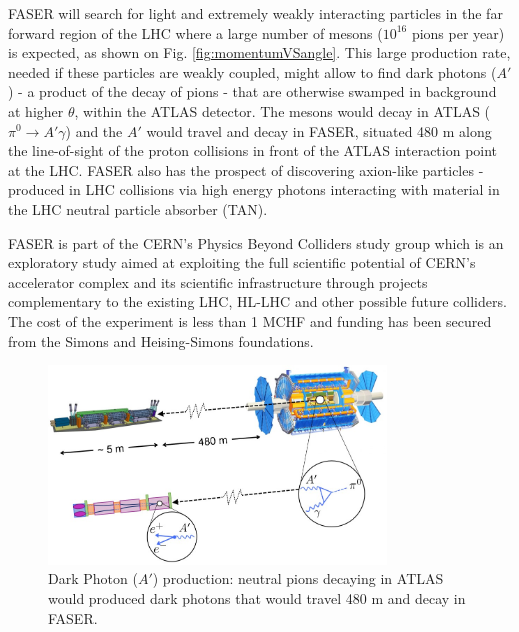 FASER will search for light and extremely weakly interacting particles in the far forward region of the LHC where a large number of mesons ($10^{16}$ pions per year) is expected, as shown on Fig. \ref{fig:momentumVSangle}. This large production rate, needed if these particles are weakly coupled, might allow to find dark photons ($A'$) - a product of the decay of pions - that are otherwise swamped in background at higher $\theta$, within the ATLAS detector. The mesons would decay in ATLAS ($\pi^{0}\rightarrow A'\gamma$) and the $A'$ would travel and decay in FASER, situated 480 m along the line-of-sight of the proton collisions in front of the ATLAS interaction point at the LHC. FASER also has the prospect of discovering axion-like particles - produced in LHC collisions via high energy
photons interacting with material in the LHC neutral particle absorber
(TAN). 

FASER is part of the CERN's Physics Beyond Colliders study group which is an exploratory study aimed at exploiting the full scientific potential of CERN's accelerator complex and its scientific infrastructure through projects complementary to the existing LHC, HL-LHC and other possible future colliders. The cost of the
experiment is less than 1 MCHF and funding has been secured from the Simons and Heising-Simons foundations.

\begin{figure}[htbp!] 
\centering    
\includegraphics[width=0.8\textwidth]{Introduction/Figs/Raster/DarkPhotonProduction.jpg}
\caption[Dark Photon Production]{Dark Photon ($A'$) production: neutral pions decaying in ATLAS would produced dark photons that would travel 480 m and decay in FASER.}
\label{fig:DarkPhotonProduction}
\end{figure}

